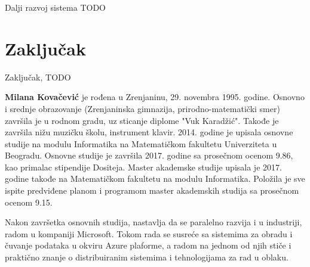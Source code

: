 \documentclass[12pt,oneside]{memoir}
\begin{document}
Dalji razvoj sistema TODO


\chapter{Zaključak}
Zaključak, TODO

\literatura

\backmatter

\begin{biografija}
  \textbf{Milana Kovačević} je rođena u Zrenjaninu, 29. novembra 1995. godine. Osnovno i srednje obrazovanje (Zrenjaninska gimnazija, prirodno-matematički smer) završila je u rodnom gradu, uz sticanje diplome "Vuk Karadžić". Takođe je završila nižu muzičku školu, instrument klavir.
2014. godine je upisala osnovne studije na modulu Informatika na Matematičkom fakultetu Univerziteta u Beogradu. Osnovne studije je završila 2017. godine sa prosečnom ocenom 9.86, kao primalac stipendije Dositeja. Master akademske studije upisala je 2017. godine takođe na Matematičkom fakultetu na modulu Informatika. Položila je sve ispite predviđene planom i programom master akademskih studija sa prosečnom ocenom 9.15.

Nakon završetka osnovnih studija, nastavlja da se paralelno razvija i u industriji, radom u kompaniji Microsoft. Tokom rada se susreće sa sistemima za obradu i čuvanje podataka u okviru Azure plaforme, a radom na jednom od njih stiče i praktično znanje o distribuiranim sistemima i tehnologijama za rad u oblaku.

\end{biografija}
\end{document}
